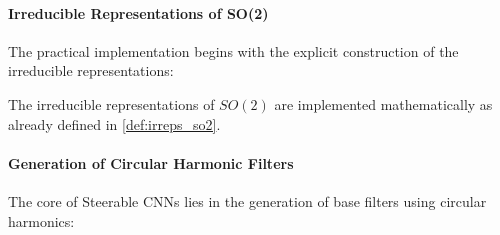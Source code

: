 \paragraph{Irreducible Representations of SO(2)}

The practical implementation begins with the explicit construction of the irreducible representations:

The irreducible representations of $SO(2)$ are implemented mathematically as already defined in \autoref{def:irreps_so2}.

\paragraph{Generation of Circular Harmonic Filters}

The core of Steerable CNNs lies in the generation of base filters using circular harmonics:

